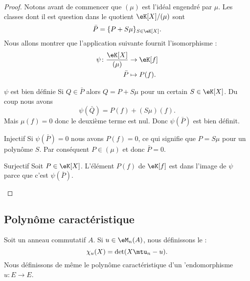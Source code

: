 \begin{proof}
    Notons avant de commencer que \( (\mu)\) est l'idéal engendré par \( \mu\). Les classes dont il est question dans le quotient \( \eK[X]/(\mu)\) sont 
    \begin{equation}
        \bar P=\{ P+S\mu \}_{S\in \eK[X]}.
    \end{equation}
    Nous allons montrer que l'application suivante fournit l'isomorphisme : 
    \begin{equation}
        \begin{aligned}
            \psi\colon \frac{ \eK[X] }{ (\mu) }&\to \eK[f] \\
            \bar P&\mapsto P(f). 
        \end{aligned}
    \end{equation}
    \begin{subproof}
        \item[\( \psi\) est bien définie]
            Si \( Q\in \bar P\) alors \( Q=P+S\mu\) pour un certain \( S\in \eK[X]\). Du coup nous avons
            \begin{equation}
                \psi(\bar Q)=P(f)+(S\mu)(f).
            \end{equation}
            Mais \( \mu(f)=0\) donc le deuxième terme est nul. Donc \( \psi(\bar P)\) est bien définit.
        \item[Injectif]
            Si \( \psi(\bar P)=0\) nous avons \( P(f)=0\), ce qui signifie que \( P=S\mu\) pour un polynôme \( S\). Par conséquent \( P\in (\mu)\) et donc \( \bar P=0\).
        \item[Surjectif]
            Soit \( P\in \eK[X]\). L'élément \( P(f) \) de \( \eK[f]\) est dans l'image de \( \psi\) parce que c'est \( \psi(\bar P)\).
    \end{subproof}
\end{proof}

\subsection{Polynôme caractéristique}

\begin{definition}  \label{DefOWQooXbybYD}
    Soit un anneau commutatif \( A\). Si \( u\in\eM_n(A)\), nous définissons le  :
    \begin{equation}    \label{Eqkxbdfu}
        \chi_u(X)=\det(X\mtu_n-u).
    \end{equation} 
    Nous définissons de même le polynôme caractéristique d'un 'endomorphisme \( u\colon E\to E\).
\end{definition}

